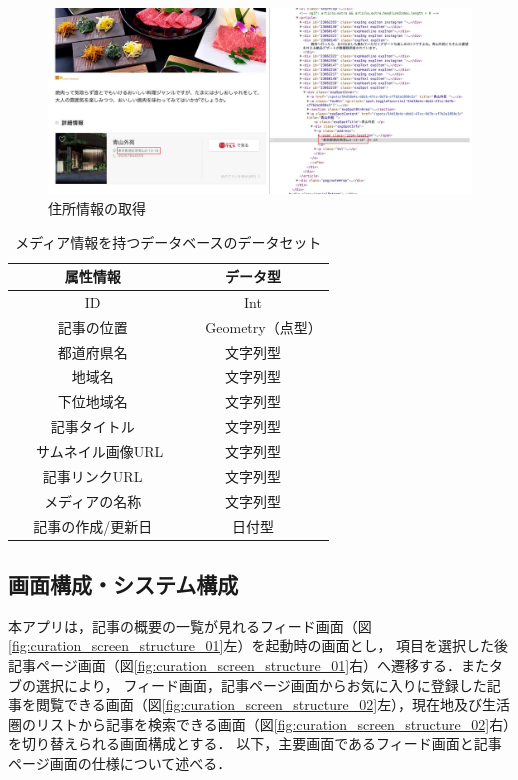 \documentclass[a4paper]{jsarticle}
\begin{document}
\begin{enumerate}
\begin{enumerate}
\fifigure
\begin{figure}[H]
  \begin{center}
    \includegraphics[width=0.95\hsize]{./images/curation_scraping_article.jpg}
    \caption{住所情報の取得}
    \label{fig:curation-scraping-article}
  \end{center}
\end{figure}
\fi

\begin{table}[H]
  \begin{center}
    \caption{メディア情報を持つデータベースのデータセット}
    \renewcommand\arraystretch{1.4}
    \begin{tabular}{|c|c|}
      \hline
      属性情報 & データ型 \\
      \hline
      \hline
      ID & Int \\
      \hline
      記事の位置 & 　Geometry（点型）　 \\
      \hline
      都道府県名 & 文字列型 \\
      \hline
      地域名 & 文字列型 \\
      \hline
      下位地域名 & 文字列型 \\
      \hline
      記事タイトル & 文字列型 \\
      \hline
      　サムネイル画像URL　 & 文字列型 \\
      \hline
      記事リンクURL & 文字列型 \\
      \hline
      メディアの名称 & 文字列型 \\
      \hline
      記事の作成/更新日 & 日付型 \\
      \hline
    \end{tabular}
    \label{tab:curation-database}
  \end{center}
\end{table}


\subsection{画面構成・システム構成}
本アプリは，記事の概要の一覧が見れるフィード画面（図\ref{fig:curation_screen_structure_01}左）を起動時の画面とし，
項目を選択した後記事ページ画面（図\ref{fig:curation_screen_structure_01}右）へ遷移する．またタブの選択により，
フィード画面，記事ページ画面からお気に入りに登録した記事を閲覧できる画面（図\ref{fig:curation_screen_structure_02}左），現在地及び生活圏のリストから記事を検索できる画面（図\ref{fig:curation_screen_structure_02}右）を切り替えられる画面構成とする．
以下，主要画面であるフィード画面と記事ページ画面の仕様について述べる．


\end{enumerate}
\end{enumerate}
\end{document}
